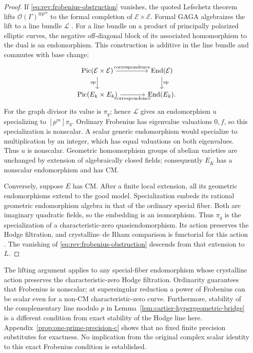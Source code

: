 \begin{proof}
If \eqref{eq:rev:frobenius-obstruction} vanishes, the quoted
Lefschetz theorem lifts $\mathcal O(\Gamma)^{\otimes p^m}$
to the formal completion of $\mathcal E\times\mathcal E$.
Formal GAGA algebraizes the lift to a line bundle $\mathcal L$
\cite[Example 4.5(b)]{MaulikPoonen}.  For a line bundle on a
product of principally polarized elliptic curves, the negative
off-diagonal block of its associated homomorphism to the dual
is an endomorphism.  This construction is additive in the line
bundle and commutes with base change:
\[
\begin{tikzcd}[column sep=large]
 \operatorname{Pic}(\mathcal E\times\mathcal E)
      \arrow[r,"\text{correspondence}"]\arrow[d,"\mathrm{sp}"']
   &\operatorname{End}(\mathcal E)\arrow[d,"\mathrm{sp}"]\\
 \operatorname{Pic}(E_k\times E_k)
      \arrow[r,"\text{correspondence}"']
   &\operatorname{End}(E_k).
\end{tikzcd}
\]
For the graph divisor its value is $\pi_q$; hence $\mathcal L$
gives an endomorphism $u$ specializing to $[p^m]\pi_q$.
Ordinary Frobenius has eigenvalue valuations $0,f$, so this
specialization is nonscalar.  A scalar generic endomorphism would
specialize to multiplication by an integer, which has equal
valuations on both eigenvalues.  Thus $u$ is nonscalar.  Geometric
homomorphism groups of abelian varieties are unchanged by extension
of algebraically closed fields; consequently $E_{\overline K}$
has a nonscalar endomorphism and has CM.

Conversely, suppose $E$ has CM.  After a finite local extension,
all its geometric endomorphisms extend to the good model.
Specialization embeds its rational geometric endomorphism algebra
in that of the ordinary special fiber.  Both are imaginary
quadratic fields, so the embedding is an isomorphism.  Thus
$\pi_q$ is the specialization of a characteristic-zero
quasiendomorphism.  Its action preserves the Hodge filtration,
and crystalline--de Rham comparison is functorial for this action
\cite[Theorem 4.21]{MaulikPoonen}.  The vanishing of
\eqref{eq:rev:frobenius-obstruction} descends from that extension
to $L$.
\end{proof}

\begin{remark}\label{rem:one-prime-scope-c}
The lifting argument applies to any special-fiber endomorphism
whose crystalline action preserves the characteristic-zero Hodge
filtration.  Ordinarity guarantees that Frobenius is nonscalar;
at supersingular reduction a power of Frobenius can be scalar
even for a non-CM characteristic-zero curve.  Furthermore,
stability of the complementary line modulo $p$ in
Lemma~\ref{lem:cartier-hypergeometric-bridge} is a different
condition from exact stability of the Hodge line here.
Appendix~\ref{prop:one-prime-precision-c} shows that no fixed
finite precision substitutes for exactness.  No implication
from the original complex scalar identity to this exact
Frobenius condition is established.
\end{remark}
